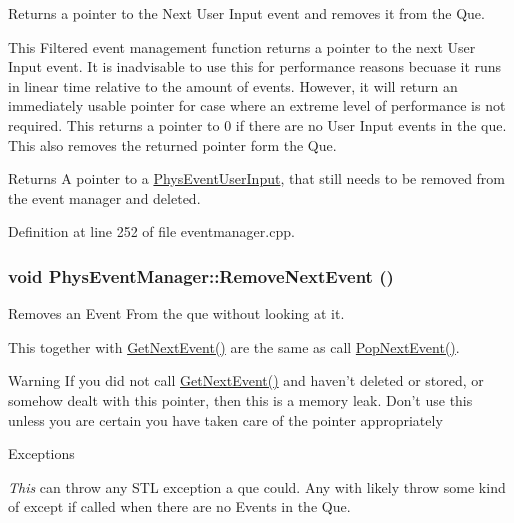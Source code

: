 Returns a pointer to the Next User Input event and removes it from the Que. 

This Filtered event management function returns a pointer to the next User Input event. It is inadvisable to use this for performance reasons becuase it runs in linear time relative to the amount of events. However, it will return an immediately usable pointer for case where an extreme level of performance is not required. This returns a pointer to 0 if there are no User Input events in the que. This also removes the returned pointer form the Que. \begin{DoxyReturn}{Returns}
A pointer to a \hyperlink{classPhysEventUserInput}{PhysEventUserInput}, that still needs to be removed from the event manager and deleted. 
\end{DoxyReturn}


Definition at line 252 of file eventmanager.cpp.

\hypertarget{classPhysEventManager_ad040054bd9018ff0fd27ad78ec1e87fa}{
\subsubsection[{RemoveNextEvent}]{\setlength{\rightskip}{0pt plus 5cm}void PhysEventManager::RemoveNextEvent ()}}
\label{d5/dd7/classPhysEventManager_ad040054bd9018ff0fd27ad78ec1e87fa}


Removes an Event From the que without looking at it. 

This together with \hyperlink{classPhysEventManager_a1ab0da9e37f43c2c0d5af1dae26dcaf2}{GetNextEvent()} are the same as call \hyperlink{classPhysEventManager_a23091695829acad90c499f6724fe048c}{PopNextEvent()}. \begin{DoxyWarning}{Warning}
If you did not call \hyperlink{classPhysEventManager_a1ab0da9e37f43c2c0d5af1dae26dcaf2}{GetNextEvent()} and haven't deleted or stored, or somehow dealt with this pointer, then this is a memory leak. Don't use this unless you are certain you have taken care of the pointer appropriately 
\end{DoxyWarning}

\begin{DoxyExceptions}{Exceptions}
\item[{\em This}]can throw any STL exception a que could. Any with likely throw some kind of except if called when there are no Events in the Que. \end{DoxyExceptions}


